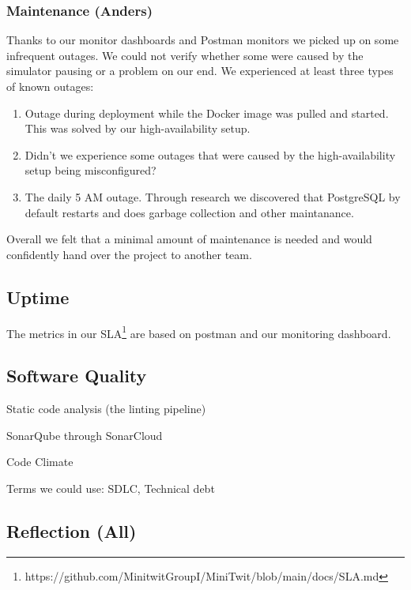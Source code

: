 \documentclass{article}
\begin{document}
\subsubsection{Maintenance (Anders)}

Thanks to our monitor dashboards and Postman monitors we picked up on some infrequent outages. We could not verify whether some were caused by the simulator pausing or a problem on our end. We experienced at least three types of known outages:

\begin{enumerate}
    \item Outage during deployment while the Docker image was pulled and started. This was solved by our high-availability setup. 
    \item Didn't we experience some outages that were caused by the high-availability setup being misconfigured?
    \item The daily 5 AM outage. Through research we discovered that PostgreSQL by default restarts and does garbage collection and other maintanance. 
\end{enumerate}

Overall we felt that a minimal amount of maintenance is needed and would confidently hand over the project to another team. 

\subsection{Uptime}

The metrics in our SLA\footnote{https://github.com/MinitwitGroupI/MiniTwit/blob/main/docs/SLA.md} are based on postman and our monitoring dashboard. 





\subsection{Software Quality}



Static code analysis (the linting pipeline)

SonarQube through SonarCloud 

Code Climate

Terms we could use: SDLC, Technical debt


\subsection{Reflection (All)}
\end{document}
